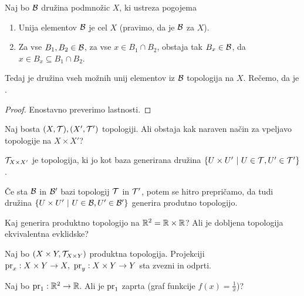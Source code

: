 \begin{trditev}
    \label{trd:baza}
    Naj bo $\mathcal{B}$ družina podmnožic $X$, ki ustreza pogojema
    \begin{enumerate}
        \item Unija elementov $\mathcal{B}$ je cel $X$ (pravimo, da je $\mathcal{B}$  za $X$).
        \item Za vse $B_1, B_2 \in \mathcal{B}$, za vse $x \in B_1 \cap B_2$, obstaja tak $B_x \in \mathcal{B}$, da $x \in B_x \subseteq B_1 \cap B_2$.
    \end{enumerate} 
    Tedaj je družina vseh možnih unij elementov iz $\mathcal{B}$ topologija na $X$.     
    Rečemo, da je .
\end{trditev}

\begin{proof}
    Enostavno preverimo lastnosti.
\end{proof}

\begin{primer}
    Naj bosta $(X, \mathcal{T}), (X', \mathcal{T}')$ topologiji. Ali obstaja kak naraven način za vpeljavo topologije na $X \times X'$?
\end{primer}
    
\begin{definicija}
     $\mathcal{T}_{X \times X'}$ je topologija, ki jo kot baza generirana družina $\left\{U \times U' \ | \ U \in \mathcal{T}, U' \in \mathcal{T}'\right\}$.
\end{definicija}

\begin{opomba}
    Če sta $\mathcal{B}$ in $\mathcal{B}'$ bazi topologij $\mathcal{T}$ in $\mathcal{T}'$, potem se hitro prepričamo, da tudi družina $\left\{U \times U' \ | \ U \in \mathcal{B}, U' \in \mathcal{B}'\right\}$ generira produtno topologijo.
\end{opomba}

\begin{primer}
    Kaj generira produktno topologijo na $\mathbb{R}^2 = \mathbb{R} \times \mathbb{R}$? Ali je dobljena topologija ekvivalentna evklidske?
\end{primer}

\begin{trditev}
    Naj bo $(X \times Y, \mathcal{T}_{X \times Y})$ produktna topologija. Projekciji $\operatorname{pr}_x: X \times Y \to X, \ \operatorname{pr}_y: X \times Y \to Y$ sta zvezni in odprti.
\end{trditev}

\begin{primer} 
    Naj bo $\operatorname{pr}_1: \mathbb{R}^2 \to \mathbb{R}$. Ali je $\operatorname{pr}_1$ zaprta (graf funkcije $f(x) = \frac{1}{x}$)?    
\end{primer}

